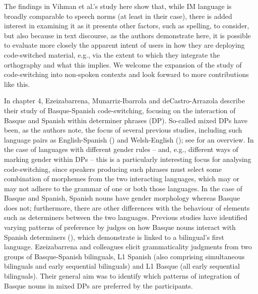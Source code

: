 \documentclass[output=paper]{langscibook}
\begin{document}
The findings in Vihman et al.’s study here show that, while IM language is broadly comparable to speech norms (at least in their case), there is added interest in examining it as it presents other factors, such as spelling, to consider, but also because in text discourse, as the authors demonstrate here, it is possible to evaluate more closely the apparent intent of users in how they are deploying code-switched material, e.g., via the extent to which they integrate the orthography and what this implies. We welcome the expansion of the study of code-switching into non-spoken contexts and look forward to more contributions like this.

In chapter 4, Ezeizabarrena, Munarriz-Ibarrola and deCastro-Arrazola describe their study of Basque-Spanish code-switching, focusing on the interaction of Basque and Spanish within determiner phrases (DP). So-called mixed DPs have been, as the authors note, the focus of several previous studies, including such language pairs as English-Spanish (\citealt{Dussias2003, ValdésKroff2016}) and Welsh-English (\citealt{ParafitaCoutoEtAl2013, ParafitaCoutoGullberg2019}); see \citealt{BellamyParafitaCouto2022} for an overview. In the case of languages with different gender rules – and, e.g., different ways of marking gender within DPs – this is a particularly interesting focus for analysing code-switching, since speakers producing such phrases must select some combination of morphemes from the two interacting languages, which may or may not adhere to the grammar of one or both those languages. In the case of Basque and Spanish, Spanish nouns have gender morphology whereas Basque does not; furthermore, there are other differences with the behaviour of elements such as determiners between the two languages. Previous studies have identified varying patterns of preference by judges on how Basque nouns interact with Spanish determiners (\citealt{BadiolaSande2018, IriondoEtxeberria2017, ParafitaCoutoEtAl2015}), which \citet{Munarriz-IbarrolaEtAl2021} demonstrate is linked to a bilingual’s first language. Ezeizabarrena and colleagues elicit grammaticality judgments from two groups of Basque-Spanish bilinguals, L1 Spanish (also comprising simultaneous bilinguals and early sequential bilinguals) and L1 Basque (all early sequential bilinguals). Their general aim was to identify which patterns of integration of Basque nouns in mixed DPs are preferred by the participants.
\end{document}
